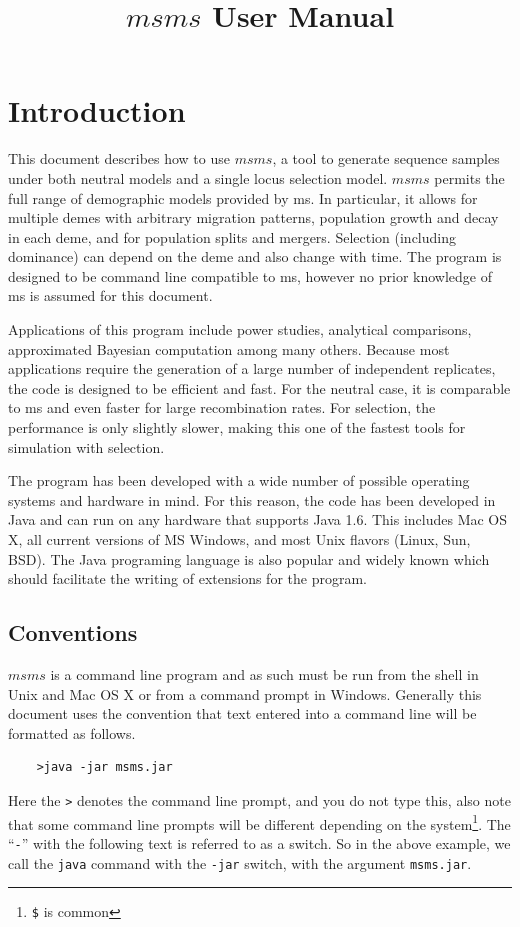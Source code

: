 \documentclass{article}
\begin{document}
\title{$msms$ User Manual}  
\maketitle
\section{Introduction}  

This document describes how to use $msms$, a tool to generate sequence samples 
under both neutral models and a single locus selection model. $msms$ permits the
full range of demographic models provided by ms\citep{hudson_generating_2002}.
In particular, it allows for multiple demes with arbitrary migration patterns,
population growth and decay in each deme, and for population splits and
mergers. Selection (including dominance) can depend on the deme and also change
with time. The program is designed to be command line compatible to ms, however
no prior knowledge of ms is assumed for this document. 

Applications of this program include power studies, analytical comparisons,
approximated Bayesian computation among many others. Because most applications
require the generation of a large number of independent replicates, the code is
designed to be efficient and fast. For the neutral case, it is comparable to ms
and even faster for large recombination rates. For selection, the performance is
only slightly slower, making this one of the fastest tools for simulation with
selection.
 
The program has been developed with a wide number of possible operating systems
and hardware in mind. For this reason, the code has been developed in Java and
can run on any hardware that supports Java 1.6. This includes Mac OS X, all
current versions of MS Windows, and most Unix flavors (Linux, Sun, BSD). The
Java programing language is also popular and widely known which should
facilitate the writing of extensions for the program.

\subsection{Conventions}

$msms$ is a command line program and as such must be run from the shell in Unix
and Mac OS X or from a command prompt in Windows. Generally this document uses
the convention that text entered into a command line will be formatted as
follows.
\begin{verbatim}
	>java -jar msms.jar
\end{verbatim}
Here the {\tt >} denotes the command line prompt, and you do not type this, also
note that some command line prompts will be different depending on the
system\footnote{{\tt \$} is common }. The ``{\tt -}'' with the following text
is referred to as a switch. So in the above example, we call the {\tt java}
command with the {\tt -jar} switch, with the argument {\tt msms.jar}. 
\end{document}

